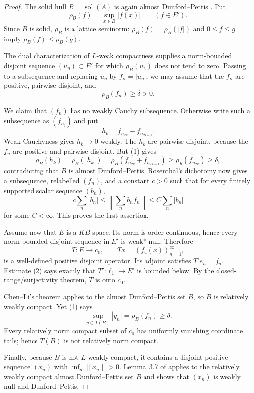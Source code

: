 \documentclass[11pt]{article}
\theoremstyle{remark}
\newcommand{\solh}{\operatorname{sol}}
\begin{document}
\begin{proof}
The solid hull $B=\solh(A)$ is again almost Dunford--Pettis
\cite[p.~2]{ChenLi}.  Put
\[
  \rho_B(f)=\sup_{x\in B}|f(x)| \qquad (f\in E').
\]
Since $B$ is solid, $\rho_B$ is a lattice seminorm:
$\rho_B(f)=\rho_B(|f|)$ and $0\leq f\leq g$ imply
$\rho_B(f)\leq\rho_B(g)$.

The dual characterization of $L$-weak compactness
\cite[p.~3]{EFMM} supplies a norm-bounded disjoint sequence $(u_n)\subset E'$
for which $\rho_B(u_n)$ does not tend to zero.  Passing to a subsequence and
replacing $u_n$ by $f_n=|u_n|$, we may assume that the $f_n$ are positive,
pairwise disjoint, and
\[
  \rho_B(f_n)\geq\delta>0.                                     \tag{1}
\]

We claim that $(f_n)$ has no weakly Cauchy subsequence.  Otherwise write such
a subsequence as $(f_{n_j})$ and put
\[
 h_k=f_{n_{2k}}-f_{n_{2k-1}}.
\]
Weak Cauchyness gives $h_k\to0$ weakly.  The $h_k$ are pairwise disjoint,
because the $f_n$ are positive and pairwise disjoint.  But (1) gives
\[
 \rho_B(h_k)=\rho_B(|h_k|)
 =\rho_B(f_{n_{2k}}+f_{n_{2k-1}})
 \geq\rho_B(f_{n_{2k}})\geq\delta,
\]
contradicting that $B$ is almost Dunford--Pettis.  Rosenthal's dichotomy
\cite{Rosenthal} now gives a subsequence, relabelled $(f_n)$, and a constant
$c>0$ such that for every finitely supported scalar sequence $(b_n)$,
\[
 c\sum_n|b_n|
 \leq \left\|\sum_n b_nf_n\right\|
 \leq C\sum_n|b_n|                                             \tag{2}
\]
for some $C<\infty$.
This proves the first assertion.

Assume now that $E$ is a $KB$-space.  Its norm is order continuous, hence
every norm-bounded disjoint sequence in $E'$ is weak* null.  Therefore
\[
 T:E\longrightarrow c_0,\qquad Tx=(f_n(x))_{n=1}^{\infty},       \tag{3}
\]
is a well-defined positive disjoint operator.  Its adjoint satisfies
$T'e_n=f_n$.  Estimate (2) says exactly that $T':\ell_1\to E'$ is bounded
below.  By the closed-range/surjectivity theorem, $T$ is onto $c_0$.

Chen--Li's theorem applies to the almost Dunford--Pettis set $B$, so $B$ is
relatively weakly compact.  Yet (1) says
\[
 \sup_{y\in T(B)}|y_n|=\rho_B(f_n)\geq\delta.
\]
Every relatively norm compact subset of $c_0$ has uniformly vanishing
coordinate tails; hence $T(B)$ is not relatively norm compact.

Finally, because $B$ is not $L$-weakly compact, it contains a disjoint
positive sequence $(x_n)$ with $\inf_n\|x_n\|>0$.  Lemma~3.7 of \cite{EFMM}
applies to the relatively weakly compact almost Dunford--Pettis set $B$ and
shows that $(x_n)$ is weakly null and Dunford--Pettis.
\end{proof}
\end{document}
